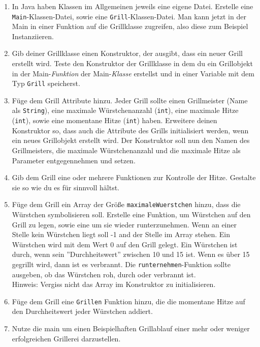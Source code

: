 \documentclass{../../sheet}
\begin{document}
\begin{enumerate}
    \item In Java haben Klassen im Allgemeinen jeweils eine eigene Datei. Erstelle eine \texttt{Main}-Klassen-Datei, sowie eine \texttt{Grill}-Klassen-Datei. Man kann jetzt in der Main in einer Funktion auf die Grillklasse zugreifen, also diese zum Beispiel Instanziieren.
    \item Gib deiner Grillklasse einen Konstruktor, der ausgibt, dass ein neuer Grill erstellt wird. Teste den Konstruktor der Grillklasse in dem du ein Grillobjekt in der Main-\textit{Funktion} der Main-\textit{Klasse} erstellst und in einer Variable mit dem Typ \texttt{Grill} speicherst.
    \item Füge dem Grill Attribute hinzu. Jeder Grill sollte einen Grillmeister (Name als \texttt{String}), eine maximale Würstchenanzahl (\texttt{int}), eine maximale Hitze (\texttt{int}), sowie eine momentane Hitze (\texttt{int}) haben. Erweitere deinen Konstruktor so, dass auch die Attribute des Grills initialisiert werden, wenn ein neues Grillobjekt erstellt wird. Der Konstruktor soll nun den Namen des Grillmeisters, die maximale Würstchenanzahl und die maximale Hitze als Parameter entgegennehmen und setzen.
    \item Gib dem Grill eine oder mehrere Funktionen zur Kontrolle der Hitze. Gestalte sie so wie du es für sinnvoll hältst.
    \item Füge dem Grill ein Array der Größe \texttt{maximaleWuerstchen} hinzu, dass die Würstchen symbolisieren soll. Erstelle eine Funktion, um Würstchen auf den Grill zu legen, sowie eine um sie wieder runterzunehmen. Wenn an einer Stelle kein Würstchen liegt soll -1 and der Stelle im Array stehen. Ein Würstchen wird mit dem Wert 0 auf den Grill gelegt. Ein Würstchen ist durch, wenn sein ''Durchheitswert'' zwischen 10 und 15 ist. Wenn es über 15 gegrillt wird, dann ist es verbrannt. Die \texttt{runternehmen}-Funktion sollte ausgeben, ob das Würstchen roh, durch oder verbrannt ist.\\
    Hinweis: Vergiss nicht das Array im Konstruktor zu initialisieren.
    \item Füge dem Grill eine \texttt{Grillen} Funktion hinzu, die die momentane Hitze auf den Durchheitswert jeder Würstchen addiert.
    \item Nutze die main um einen Beispielhaften Grillablauf einer mehr oder weniger erfolgreichen Grillerei darzustellen. 
\end{enumerate}
\end{document}

